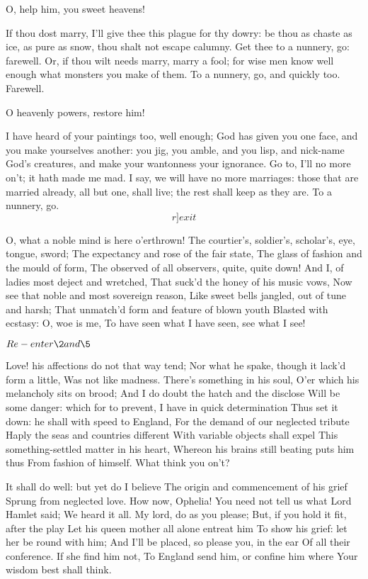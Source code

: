 \documentclass[11pt]{book}
\begin{document}
\4	O, help him, you sweet heavens!

\1	If thou dost marry, I'll give thee this plague for
	thy dowry: be thou as chaste as ice, as pure as
	snow, thou shalt not escape calumny. Get thee to a
	nunnery, go: farewell. Or, if thou wilt needs
	marry, marry a fool; for wise men know well enough
	what monsters you make of them. To a nunnery, go,
	and quickly too. Farewell.

\4	O heavenly powers, restore him!

\1	I have heard of your paintings too, well enough; God
	has given you one face, and you make yourselves
	another: you jig, you amble, and you lisp, and
	nick-name God's creatures, and make your wantonness
	your ignorance. Go to, I'll no more on't; it hath
	made me mad. I say, we will have no more marriages:
	those that are married already, all but one, shall
	live; the rest shall keep as they are. To a
	nunnery, go. 	\[r]exit\]

\endProsa

\4	O, what a noble mind is here o'erthrown!
	The courtier's, soldier's, scholar's, eye, tongue, sword;
	The expectancy and rose of the fair state,
	The glass of fashion and the mould of form,
	The observed of all observers, quite, quite down!
	And I, of ladies most deject and wretched,
	That suck'd the honey of his music vows,
	Now see that noble and most sovereign reason,
	Like sweet bells jangled, out of tune and harsh;
	That unmatch'd form and feature of blown youth
	Blasted with ecstasy: O, woe is me,
	To have seen what I have seen, see what I see!

	\(Re-enter \2 and \5\)

\2	Love! his affections do not that way tend;
	Nor what he spake, though it lack'd form a little,
	Was not like madness. There's something in his soul,
	O'er which his melancholy sits on brood;
	And I do doubt the hatch and the disclose
	Will be some danger: which for to prevent,
	I have in quick determination
	Thus set it down: he shall with speed to England,
	For the demand of our neglected tribute
	Haply the seas and countries different
	With variable objects shall expel
	This something-settled matter in his heart,
	Whereon his brains still beating puts him thus
	From fashion of himself. What think you on't?

\5	It shall do well: but yet do I believe
	The origin and commencement of his grief
	Sprung from neglected love. How now, Ophelia!
	You need not tell us what Lord Hamlet said;
	We heard it all. My lord, do as you please;
	But, if you hold it fit, after the play
	Let his queen mother all alone entreat him
	To show his grief: let her be round with him;
	And I'll be placed, so please you, in the ear
	Of all their conference. If she find him not,
	To England send him, or confine him where
	Your wisdom best shall think. \\
\end{document}

